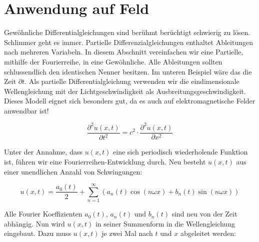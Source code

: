 %
%
%
%



\section{Anwendung auf Feld\label{fourier:section:teil0}}

Gewöhnliche Differentialgleichungen sind berühmt berüchtigt schwierig zu lösen.
Schlimmer geht es immer.
Partielle Differenzialgleichungen enthaltet Ableitungen nach mehreren Variabeln.
In diesem Abschnitt vereinfachen wir eine Partielle, mithilfe der Fourierreihe, in eine Gewöhnliche.
Alle Ableitungen sollten schlussendlich den identischen Nenner besitzen. 
Im unteren Beispiel wäre das die Zeit $\partial t$.
Als partielle Differentialgleichung verwenden wir die eindimensionale Wellengleichung mit der Lichtgeschwindigkeit als Ausbreitungsgeschwindigkeit. 
Dieses Modell eignet sich besonders gut, da es auch auf elektromagnetische Felder anwendbar ist!

\begin{equation}
	\frac{\partial^2 u(x, t)}{\partial t^2} = c^2 \cdot \frac{\partial^2 u(x, t)}{\partial x^2}
\end{equation}

Unter der Annahme, dass $u(x, t)$ eine sich periodisch wiederholende Funktion ist, führen wir eine Fourierreihen-Entwicklung durch. 
Neu besteht $u(x, t)$ aus einer unendlichen Anzahl von Schwingungen:

\begin{equation}
	u(x,t) = \frac{a_0(t)}{2} + \sum_{n=1}^{\infty} \left( a_n(t) \cos(n \omega x) + b_n(t) \sin(n \omega x) \right)
\end{equation}

Alle Fourier Koeffizienten $a_0(t)$, $a_n(t)$ und $b_n(t)$ sind neu von der Zeit abhängig. 
Nun wird $u(x,t)$ in seiner Summenform in die Wellengleichung eingebaut. 
Dazu muss $u(x,t)$ je zwei Mal nach $t$ und $x$ abgeleitet werden:


